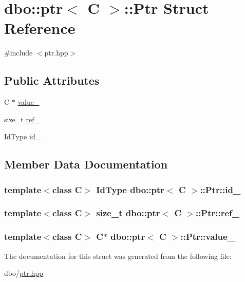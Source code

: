 \hypertarget{structdbo_1_1ptr_1_1_ptr}{\section{dbo\+:\+:ptr$<$ C $>$\+:\+:Ptr Struct Reference}
\label{structdbo_1_1ptr_1_1_ptr}
}


{\ttfamily \#include $<$ptr.\+hpp$>$}

\subsection*{Public Attributes}
\begin{DoxyCompactItemize}
\item 
C $\ast$ \hyperlink{structdbo_1_1ptr_1_1_ptr_a2c8c1946bb5c45335527e5061114d006}{value\+\_\+}
\item 
size\+\_\+t \hyperlink{structdbo_1_1ptr_1_1_ptr_ae83cda6b6079bc21863c09008b99ef71}{ref\+\_\+}
\item 
\hyperlink{classdbo_1_1ptr_a01fdb2e2c0743eb8bd1b822ccc8d4cd4}{Id\+Type} \hyperlink{structdbo_1_1ptr_1_1_ptr_a2a31f071054839bcbadb7e82ac5f3495}{id\+\_\+}
\end{DoxyCompactItemize}


\subsection{Member Data Documentation}
\hypertarget{structdbo_1_1ptr_1_1_ptr_a2a31f071054839bcbadb7e82ac5f3495}{
\subsubsection[{id\+\_\+}]{\setlength{\rightskip}{0pt plus 5cm}template$<$class C$>$ {\bf Id\+Type} {\bf dbo\+::ptr}$<$ C $>$\+::Ptr\+::id\+\_\+}}\label{structdbo_1_1ptr_1_1_ptr_a2a31f071054839bcbadb7e82ac5f3495}
\hypertarget{structdbo_1_1ptr_1_1_ptr_ae83cda6b6079bc21863c09008b99ef71}{
\subsubsection[{ref\+\_\+}]{\setlength{\rightskip}{0pt plus 5cm}template$<$class C$>$ size\+\_\+t {\bf dbo\+::ptr}$<$ C $>$\+::Ptr\+::ref\+\_\+}}\label{structdbo_1_1ptr_1_1_ptr_ae83cda6b6079bc21863c09008b99ef71}
\hypertarget{structdbo_1_1ptr_1_1_ptr_a2c8c1946bb5c45335527e5061114d006}{
\subsubsection[{value\+\_\+}]{\setlength{\rightskip}{0pt plus 5cm}template$<$class C$>$ C$\ast$ {\bf dbo\+::ptr}$<$ C $>$\+::Ptr\+::value\+\_\+}}\label{structdbo_1_1ptr_1_1_ptr_a2c8c1946bb5c45335527e5061114d006}


The documentation for this struct was generated from the following file\+:\begin{DoxyCompactItemize}
\item 
dbo/\hyperlink{ptr_8hpp}{ptr.\+hpp}\end{DoxyCompactItemize}
